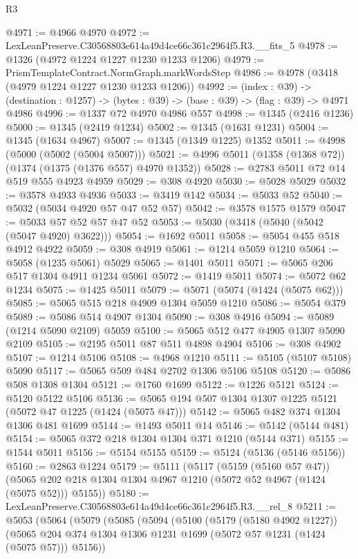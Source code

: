 \begin{lexlean}{R3}
\begin{coremodule}
@4971 := @4966 @4970
@4972 := LexLeanPreserve.C30568803e614a49d4ce66c361c2964f5.R3.__fits_5
@4978 := @1326 (@4972 @1224 @1227 @1230 @1233 @1206)
@4979 := PrismTemplateContract.NormGraph.markWordsStep
@4986 := @4978 (@3418 (@4979 @1224 @1227 @1230 @1233 @1206))
@4992 := (index : @39) ->
  (destination : @1257) -> (bytes : @39) -> (base : @39) -> (flag : @39) -> @4971 @4986
@4996 := @1337 @72 @4970 @4986 @557
@4998 := @1345 (@2416 @1236)
@5000 := @1345 (@2419 @1234)
@5002 := @1345 (@1631 @1231)
@5004 := @1345 (@1634 @4967)
@5007 := @1345 (@1349 @1225) @1352
@5011 := @4998 (@5000 (@5002 (@5004 @5007)))
@5021 := @4996 @5011 (@1358 (@1368 @72)) (@1374 (@1375 (@1376 @557) @4970 @1352))
@5028 := @2783 @5011 @72 @14 @519 @555 @4923 @4959
@5029 := @308 @4920
@5030 := @5028 @5029
@5032 := @3578 @4933 @4936
@5033 := @3419 @142
@5034 := @5033 @52
@5040 := @5032 (@5034 @4920 @57 @47 @52 @57)
@5042 := @3578 @1575 @1579
@5047 := @5033 @57 @52 @57 @47 @52
@5053 := @5030 (@3418 (@5040 (@5042 (@5047 @4920) @3622)))
@5054 := @1692 @5011
@5058 := @5054 @455 @518 @4912 @4922
@5059 := @308 @4919
@5061 := @1214 @5059 @1210
@5064 := @5058 (@1235 @5061) @5029
@5065 := @1401 @5011
@5071 := @5065 @206 @517 @1304 @4911 @1234 @5061
@5072 := @1419 @5011
@5074 := @5072 @62 @1234
@5075 := @1425 @5011
@5079 := @5071 (@5074 (@1424 (@5075 @62)))
@5085 := @5065 @515 @218 @4909 @1304 @5059 @1210
@5086 := @5054 @379
@5089 := @5086 @514 @4907 @1304
@5090 := @308 @4916
@5094 := @5089 (@1214 @5090 @2109) @5059
@5100 := @5065 @512 @477 @4905 @1307 @5090 @2109
@5105 := @2195 @5011 @87 @511 @4898 @4904
@5106 := @308 @4902
@5107 := @1214 @5106
@5108 := @4968 @1210
@5111 := @5105 (@5107 @5108) @5090
@5117 := @5065 @509 @484 @2702 @1306 @5106 @5108
@5120 := @5086 @508 @1308 @1304
@5121 := @1760 @1699
@5122 := @1226 @5121
@5124 := @5120 @5122 @5106
@5136 := @5065 @194 @507 @1304 @1307 @1225 @5121 (@5072 @47 @1225 (@1424 (@5075 @47)))
@5142 := @5065 @482 @374 @1304 @1306 @481 @1699
@5144 := @1493 @5011 @14
@5146 := @5142 (@5144 @481)
@5154 := @5065 @372 @218 @1304 @1304 @371 @1210 (@5144 @371)
@5155 := @1544 @5011
@5156 := @5154 @5155
@5159 := @5124 (@5136 (@5146 @5156))
@5160 := @2863 @1224
@5179 := @5111
    (@5117
      (@5159 (@5160 @57 @47))
      (@5065 @202 @218 @1304 @1304 @4967 @1210 (@5072 @52 @4967 (@1424 (@5075 @52))) @5155))
@5180 := LexLeanPreserve.C30568803e614a49d4ce66c361c2964f5.R3.__rel_8
@5211 := @5053
    (@5064
      (@5079
        (@5085
          (@5094
            (@5100
              (@5179 (@5180 @4902 @1227))
              (@5065 @204 @374 @1304 @1306 @1231 @1699 (@5072 @57 @1231 (@1424 (@5075 @57))) @5156))

\end{coremodule}
\end{lexlean}
